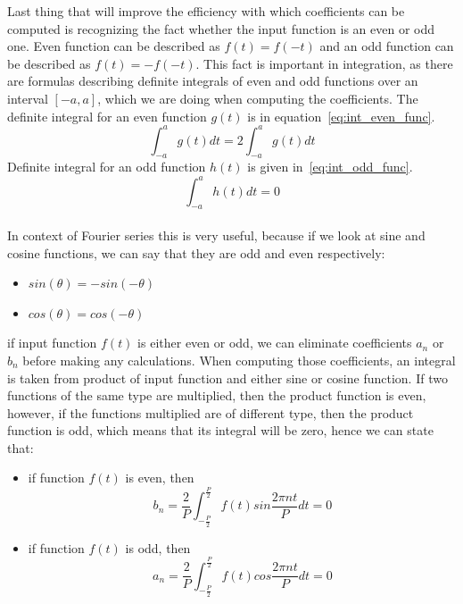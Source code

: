 \documentclass[titlepage]{article}
\begin{document}
    Last thing that will improve the efficiency with which coefficients can be
    computed is recognizing the fact whether the input function is an even or odd
    one. Even function can be described as $f(t) = f(-t)$ and an odd function can
    be described as $f(t) = -f(-t)$. This fact is important in integration, as there
    are formulas describing definite integrals of even and odd functions over an
    interval $[-a,a]$, which we are doing when computing the coefficients. The 
    definite integral for an even function $g(t)$ is in equation~\eqref{eq:int_even_func}.
    \begin{equation}\label{eq:int_even_func}
        \int_{-a}^{a}g(t)dt = 2\int_{-a}^{a}g(t)dt
    \end{equation}
    Definite integral for an odd function $h(t)$ is given in~\eqref{eq:int_odd_func}.
    \begin{equation}\label{eq:int_odd_func}
        \int_{-a}^{a}h(t)dt = 0
    \end{equation} 
    \\
    In context of Fourier series this is very useful, because if we look at sine
    and cosine functions, we can say that they are odd and even respectively:
    \begin{itemize}
        \item $sin(\theta) = -sin(-\theta)$
        \item $cos(\theta) = cos(-\theta)$ 
    \end{itemize}
    if input function $f(t)$ is either even or odd, we can eliminate coefficients
    $a_n$ or $b_n$ before making any calculations. When computing those coefficients,
    an integral is taken from product of input function and either sine or cosine
    function. If two functions of the same type are multiplied, then the product
    function is even, however, if the functions multiplied are of different type,
    then the product function is odd, which means that its integral will be zero,
    hence we can state that:
    \begin{itemize}
        \item if function $f(t)$ is even, then
            \begin{equation*}
                b_n = \frac{2}{P}\int_{-\frac{P}{2}}^{\frac{P}{2}}f(t)sin\frac{2\pi nt}{P}dt = 0
            \end{equation*}
        \item if function $f(t)$ is odd, then
            \begin{equation*}
                a_n = \frac{2}{P}\int_{-\frac{P}{2}}^{\frac{P}{2}}f(t)cos\frac{2\pi nt}{P}dt = 0
            \end{equation*}
        \end{itemize}
\end{document}
